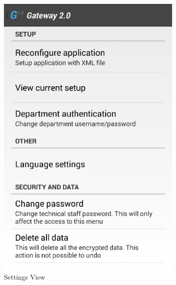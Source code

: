 \begin{figure}[H]
\centering
    \begin{subfigure}[b]{0.49\textwidth}
        \includegraphics[width=\textwidth]{img/interface/15-Settings.png}
        \caption*{Settings View}
        \label{fig:15settings}
    \end{subfigure}
    \begin{subfigure}[b]{0.49\textwidth}

\end{subfigure}
\end{figure}
